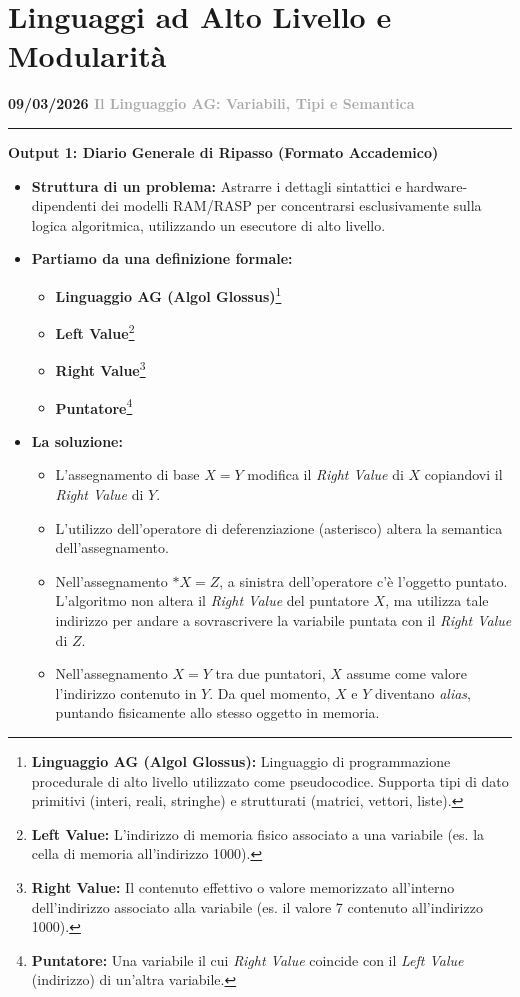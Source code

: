 \documentclass[a4paper, 11pt]{report}
\newcommand{\lezione}[2]{
\vspace{2em}
\noindent\textbf{\Large #1 \hfill \textcolor{darkgray}{#2}}
\vspace{0.5em}
\hrule
\vspace{1.5em}
}
\newcommand{\definizione}[2]{%
\textbf{#1}\footnote{\textbf{#1:} #2}%
}
\begin{document}
\chapter{Linguaggi ad Alto Livello e Modularità}

\lezione{09/03/2026}{Il Linguaggio AG: Variabili, Tipi e Semantica}
\vspace{0.5cm}
\textbf{Output 1: Diario Generale di Ripasso (Formato Accademico)}
\begin{itemize}
\item \textbf{Struttura di un problema:}
Astrarre i dettagli sintattici e hardware-dipendenti dei modelli RAM/RASP per concentrarsi esclusivamente sulla logica algoritmica, utilizzando un esecutore di alto livello.

\item \textbf{Partiamo da una definizione formale:}
\begin{itemize}
    \item \definizione{Linguaggio AG (Algol Glossus)}{Linguaggio di programmazione procedurale di alto livello utilizzato come pseudocodice. Supporta tipi di dato primitivi (interi, reali, stringhe) e strutturati (matrici, vettori, liste).}
    \item \definizione{Left Value}{L'indirizzo di memoria fisico associato a una variabile (es. la cella di memoria all'indirizzo 1000).}
    \item \definizione{Right Value}{Il contenuto effettivo o valore memorizzato all'interno dell'indirizzo associato alla variabile (es. il valore 7 contenuto all'indirizzo 1000).}
    \item \definizione{Puntatore}{Una variabile il cui \textit{Right Value} coincide con il \textit{Left Value} (indirizzo) di un'altra variabile.}
\end{itemize}

\item \textbf{La soluzione:}
\begin{itemize}
    \item L'assegnamento di base $X = Y$ modifica il \textit{Right Value} di $X$ copiandovi il \textit{Right Value} di $Y$.
    \item L'utilizzo dell'operatore di deferenziazione (asterisco) altera la semantica dell'assegnamento.
    \item Nell'assegnamento $*X = Z$, a sinistra dell'operatore c'è l'oggetto puntato. L'algoritmo non altera il \textit{Right Value} del puntatore $X$, ma utilizza tale indirizzo per andare a sovrascrivere la variabile puntata con il \textit{Right Value} di $Z$.
    \item Nell'assegnamento $X = Y$ tra due puntatori, $X$ assume come valore l'indirizzo contenuto in $Y$. Da quel momento, $X$ e $Y$ diventano \textit{alias}, puntando fisicamente allo stesso oggetto in memoria.
\end{itemize}
\end{itemize}
\end{document}
